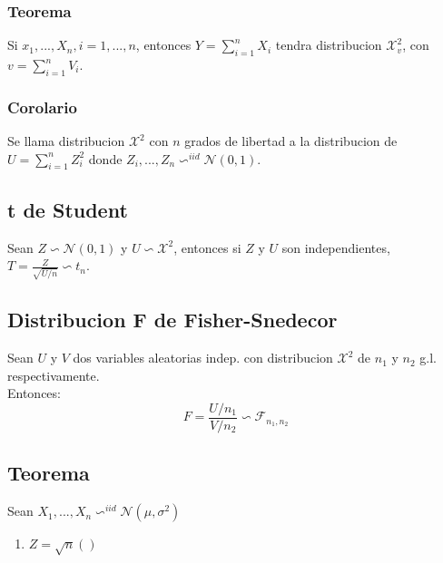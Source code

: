 \documentclass[titlepage,a4paper]{article}
\begin{document}
\subsubsection{Teorema}
Si $x_{1},...,X_{n}, i=1,...,n$, entonces $Y= \sum_{i=1}^{n}X_{i}$ tendra distribucion $\mathcal{X}^{2}_{v}$, con $v =\sum_{i=1}^{n} V_{i} $.
\subsubsection{Corolario}
Se llama distribucion $\mathcal{X}^{2}$ con $n$ grados de libertad a la distribucion de $U = \sum_{i=1}^{n} Z_{i}^{2}$ donde $Z_{i},...,Z_{n} \backsim^{iid} \mathcal{N}(0,1)$.
\subsection{t de Student}
Sean $Z \backsim \mathcal{N}(0,1)$ y $U \backsim \mathcal{X}^{2}$, entonces si $Z$ y $U$ son independientes, $T= \frac{Z}{\sqrt{U/n}} \backsim t_{n}$.
\subsection{Distribucion F de Fisher-Snedecor}
Sean $U$ y $V$ dos variables aleatorias indep. con distribucion $\mathcal{X}^{2}$ de $n_{1}$ y $n_{2}$ g.l. respectivamente.\\
Entonces:
\begin{equation*}
    F=\frac{U/n_{1}}{V/n_{2}} \backsim \mathcal{F}_{n_{1},n_{2}}
\end{equation*}
\subsection{Teorema}
Sean $X_{1},...,X_{n} \backsim^{iid} \mathcal{N}(\mu,\sigma^{2})$
\begin{enumerate}
    \item $Z=\sqrt{n} ()$
\end{enumerate}
\end{document}
